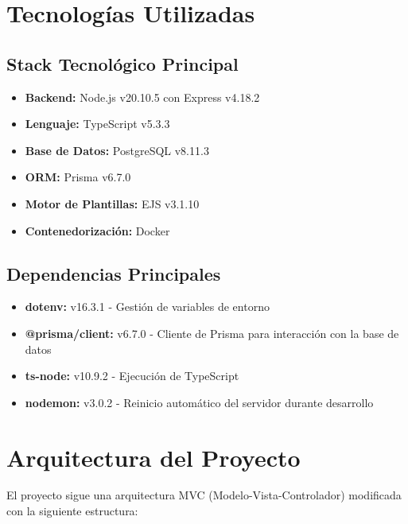 \documentclass{article}
\begin{document}
\section{Tecnologías Utilizadas}
\subsection{Stack Tecnológico Principal}
\begin{itemize}
    \item \textbf{Backend:} Node.js v20.10.5 con Express v4.18.2
    \item \textbf{Lenguaje:} TypeScript v5.3.3
    \item \textbf{Base de Datos:} PostgreSQL v8.11.3
    \item \textbf{ORM:} Prisma v6.7.0
    \item \textbf{Motor de Plantillas:} EJS v3.1.10
    \item \textbf{Contenedorización:} Docker
\end{itemize}

\subsection{Dependencias Principales}
\begin{itemize}
    \item \textbf{dotenv:} v16.3.1 - Gestión de variables de entorno
    \item \textbf{@prisma/client:} v6.7.0 - Cliente de Prisma para interacción con la base de datos
    \item \textbf{ts-node:} v10.9.2 - Ejecución de TypeScript
    \item \textbf{nodemon:} v3.0.2 - Reinicio automático del servidor durante desarrollo
\end{itemize}

\section{Arquitectura del Proyecto}
El proyecto sigue una arquitectura MVC (Modelo-Vista-Controlador) modificada con la siguiente estructura:
\end{document}
